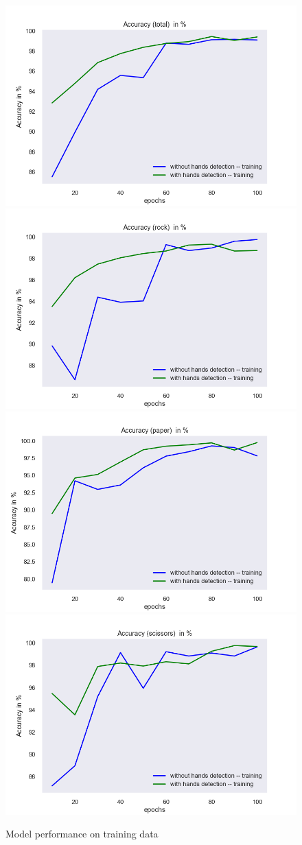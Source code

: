 \documentclass[a4paper]{article}
\begin{document}
\begin{figure}[H]
    \includegraphics[width=.49\textwidth]{img/experiment/model_comp_10steps__training_acc_total.png}\hfill
    \includegraphics[width=.49\textwidth]{img/experiment/model_comp_10steps__training_acc_rock.png}\hfill
    \\[\smallskipamount]
    \includegraphics[width=.49\textwidth]{img/experiment/model_comp_10steps__training_acc_paper.png}\hfill
    \includegraphics[width=.49\textwidth]{img/experiment/model_comp_10steps__training_acc_scissors.png}\hfill
    \caption{Model performance on training data}
    \label{fig:exp-de-acc-train}
\end{figure}
\end{document}
